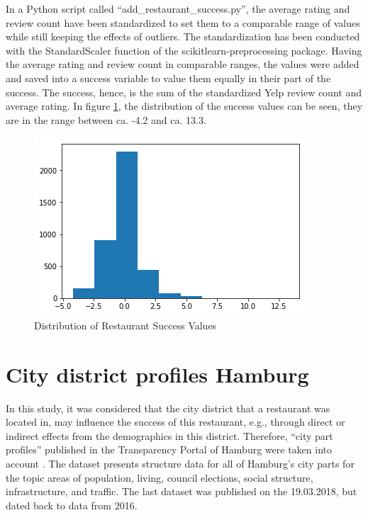 \documentclass[a4paper, 11pt, oneside]{Thesis}  %
\begin{document}
In a Python script called ``add\_restaurant\_success.py'', the average rating and review count have been standardized to set them to a comparable range of values while still keeping the effects of outliers. The standardization has been conducted with the StandardScaler function of the scikitlearn-preprocessing package. Having the average rating and review count in comparable ranges, the values were added and saved into a success variable to value them equally in their part of the success. The success, hence, is the sum of the standardized Yelp review count and average rating. In figure \ref{fig:restaurant_success_distribution}, the distribution of the success values can be seen, they are in the range between ca. -4.2 and ca. 13.3.

\begin{figure}[h]
\includegraphics[scale=0.5]{Figures/restaurant_success_distribution.png}
\centering
\caption{Distribution of Restaurant Success Values}
\label{fig:restaurant_success_distribution}
\end{figure}


\section{City district profiles Hamburg}
\label{district_profiles}

In this study, it was considered that the city district that a restaurant was located in, may influence the success of this restaurant, e.g., through direct or indirect effects from the demographics in this district. Therefore, ``city part profiles'' published in the Transparency Portal of Hamburg were taken into account \cite{Profiles2018}. The dataset presents structure data for all of Hamburg's city parts for the topic areas of population, living, council elections, social structure, infrastructure, and traffic. The last dataset was published on the 19.03.2018, but dated back to data from 2016.
\end{document}
